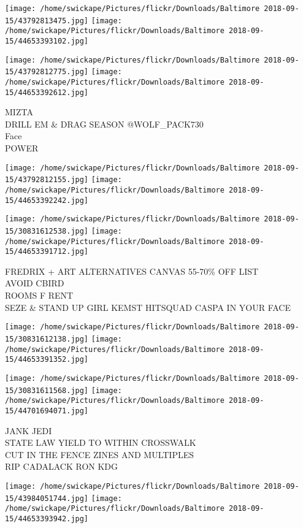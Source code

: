 \documentclass[10pt,letterpaper]{article}
\begin{document}
\texttt{[image: /home/swickape/Pictures/flickr/Downloads/Baltimore 2018-09-15/43792813475.jpg]}
\texttt{[image: /home/swickape/Pictures/flickr/Downloads/Baltimore 2018-09-15/44653393102.jpg]}

\texttt{[image: /home/swickape/Pictures/flickr/Downloads/Baltimore 2018-09-15/43792812775.jpg]}
\texttt{[image: /home/swickape/Pictures/flickr/Downloads/Baltimore 2018-09-15/44653392612.jpg]}

MIZTA\\
DRILL EM \& DRAG SEASON @WOLF\_PACK730\\
Face\\
POWER
\pagebreak

\texttt{[image: /home/swickape/Pictures/flickr/Downloads/Baltimore 2018-09-15/43792812155.jpg]}
\texttt{[image: /home/swickape/Pictures/flickr/Downloads/Baltimore 2018-09-15/44653392242.jpg]}

\texttt{[image: /home/swickape/Pictures/flickr/Downloads/Baltimore 2018-09-15/30831612538.jpg]}
\texttt{[image: /home/swickape/Pictures/flickr/Downloads/Baltimore 2018-09-15/44653391712.jpg]}

FREDRIX + ART ALTERNATIVES CANVAS 55{-}70\% OFF LIST\\
AVOID CBIRD\\
ROOMS F RENT\\
SEZE \& STAND UP GIRL KEMST HITSQUAD CASPA IN YOUR FACE
\pagebreak

\texttt{[image: /home/swickape/Pictures/flickr/Downloads/Baltimore 2018-09-15/30831612138.jpg]}
\texttt{[image: /home/swickape/Pictures/flickr/Downloads/Baltimore 2018-09-15/44653391352.jpg]}

\texttt{[image: /home/swickape/Pictures/flickr/Downloads/Baltimore 2018-09-15/30831611568.jpg]}
\texttt{[image: /home/swickape/Pictures/flickr/Downloads/Baltimore 2018-09-15/44701694071.jpg]}

JANK JEDI\\
STATE LAW YIELD TO WITHIN CROSSWALK\\
CUT IN THE FENCE ZINES AND MULTIPLES\\
RIP CADALACK RON KDG
\pagebreak

\texttt{[image: /home/swickape/Pictures/flickr/Downloads/Baltimore 2018-09-15/43984051744.jpg]}
\texttt{[image: /home/swickape/Pictures/flickr/Downloads/Baltimore 2018-09-15/44653393942.jpg]}
\end{document}
